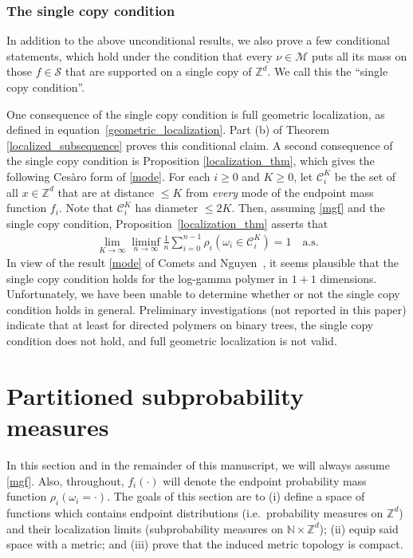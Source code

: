 \documentclass[11pt,reqno]{amsart}
\numberwithin{equation}{section}
\theoremstyle{definition}
\begin{document}
\subsubsection{The single copy condition}
In addition to the above unconditional results, we also prove a few conditional statements, which hold under the condition that every $\nu \in {\mathcal{M}}$ puts all its mass on those $f \in {\mathcal{S}}$ that are supported on a single copy of ${\mathbb{Z}}^d$. We call this the ``single copy condition''. 

One consequence of the single copy condition is full geometric localization, as defined in equation~\eqref{geometric_localization}. Part (b) of Theorem \ref{localized_subsequence} proves this conditional claim. 
A second consequence of the single copy condition is Proposition \ref{localization_thm}, which gives the following Ces\`aro form of \eqref{mode}. For each $i\ge 0$ and $K\ge 0$, let ${\mathcal{C}}_{i}^K$ be the set of all $x\in {\mathbb{Z}}^d$ that are at distance $\le K$ from {\it every} mode of the endpoint mass function $f_i$. Note that ${\mathcal{C}}_i^K$ has diameter $\le 2K$. Then, assuming \eqref{mgf} and the single copy condition, Proposition~\ref{localization_thm} asserts that 
{\begin{align*} {
\lim_{K \to \infty} \liminf_{n \to \infty} \frac{1}{n} \sum_{i = 0}^{n-1} \rho_i(\omega_i\in {\mathcal{C}}_{i}^K) = 1 \quad \mathrm{a.s.}
} \end{align*}}
In view of the result \eqref{mode} of Comets and Nguyen~\cite{comets-nguyen15}, it seems plausible that the single copy condition holds for the log-gamma polymer in $1+1$ dimensions. Unfortunately, we have been unable to determine whether or not the single copy condition holds in general. Preliminary investigations (not reported in this paper) indicate that at least for directed polymers on binary trees, the single copy condition does not hold, and full geometric localization is not valid. 

\section{Partitioned subprobability measures} \label{topology}
In this section and in the remainder of this manuscript, we will  always assume \eqref{mgf}. Also, throughout, $f_i(\cdot)$ will denote the endpoint probability mass function $\rho_i(\omega_i=\cdot)$. 
 The goals of this section are to (i) define a space of functions which contains endpoint distributions (i.e.~probability measures on ${\mathbb{Z}}^d$) and their localization limits (subprobability measures on ${\mathbb{N}} \times {\mathbb{Z}}^d$); (ii) equip said space with a metric; and (iii) prove that the induced metric topology is compact.
\end{document}
